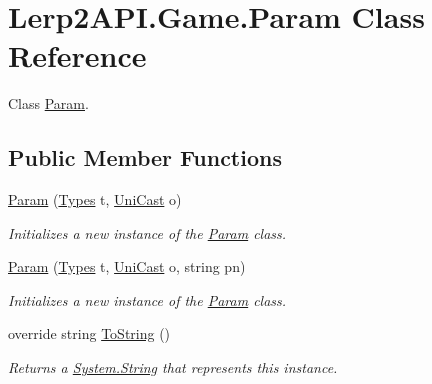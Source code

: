 \hypertarget{class_lerp2_a_p_i_1_1_game_1_1_param}{}\section{Lerp2\+A\+P\+I.\+Game.\+Param Class Reference}
\label{class_lerp2_a_p_i_1_1_game_1_1_param}


Class \hyperlink{class_lerp2_a_p_i_1_1_game_1_1_param}{Param}.  


\subsection*{Public Member Functions}
\begin{DoxyCompactItemize}
\item 
\hyperlink{class_lerp2_a_p_i_1_1_game_1_1_param_adc3bb5d52ed368ba50e1975c68216c78}{Param} (\hyperlink{namespace_lerp2_a_p_i_1_1_game_a2f182da062f210cc43f341f6992ee293}{Types} t, \hyperlink{class_lerp2_a_p_i_1_1_game_1_1_uni_cast}{Uni\+Cast} o)
\begin{DoxyCompactList}\small\item\em Initializes a new instance of the \hyperlink{class_lerp2_a_p_i_1_1_game_1_1_param}{Param} class. \end{DoxyCompactList}\item 
\hyperlink{class_lerp2_a_p_i_1_1_game_1_1_param_a4c351ce6453de13c541802f70a50bd79}{Param} (\hyperlink{namespace_lerp2_a_p_i_1_1_game_a2f182da062f210cc43f341f6992ee293}{Types} t, \hyperlink{class_lerp2_a_p_i_1_1_game_1_1_uni_cast}{Uni\+Cast} o, string pn)
\begin{DoxyCompactList}\small\item\em Initializes a new instance of the \hyperlink{class_lerp2_a_p_i_1_1_game_1_1_param}{Param} class. \end{DoxyCompactList}\item 
override string \hyperlink{class_lerp2_a_p_i_1_1_game_1_1_param_a6755d351e68f0743c4118e341a443f78}{To\+String} ()
\begin{DoxyCompactList}\small\item\em Returns a \hyperlink{namespace_lerp2_a_p_i_1_1_game_a2f182da062f210cc43f341f6992ee293a27118326006d3829667a400ad23d5d98}{System.\+String} that represents this instance. \end{DoxyCompactList}\end{DoxyCompactItemize}
